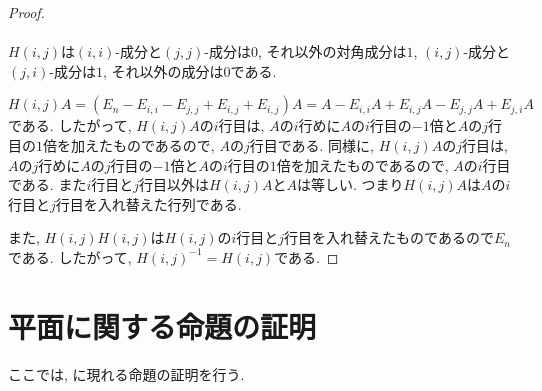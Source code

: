 \begin{proof}
  \paragraph{}
  $H(i,j)$は$(i,i)$-成分と$(j,j)$-成分は$0$, それ以外の対角成分は$1$,
  $(i,j)$-成分と$(j,i)$-成分は$1$, それ以外の成分は$0$である.

  $H(i,j)A=(E_n-E_{i,i}-E_{j,j}+E_{i,j}+E_{i,j})A=A-E_{i,i}A+E_{i,j}A-E_{j,j}A+E_{j,i}A$
  である.
  したがって,
  $H(i,j)A$の$i$行目は,
  $A$の$i$行めに$A$の$i$行目の$-1$倍と$A$の$j$行目の$1$倍を加えたものであるので,
  $A$の$j$行目である.
  同様に, $H(i,j)A$の$j$行目は,
  $A$の$j$行めに$A$の$j$行目の$-1$倍と$A$の$i$行目の$1$倍を加えたものであるので,
  $A$の$i$行目である.
  また$i$行目と$j$行目以外は$H(i,j)A$と$A$は等しい.
  つまり$H(i,j)A$は$A$の$i$行目と$j$行目を入れ替えた行列である.
  
  また, $H(i,j)H(i,j)$は$H(i,j)$の$i$行目と$j$行目を入れ替えたものであるので$E_n$である.
  したがって, $H(i,j)^{-1}=H(i,j)$である.
\end{proof}




\section{平面に関する命題の証明}
ここでは, に現れる命題の証明を行う.

